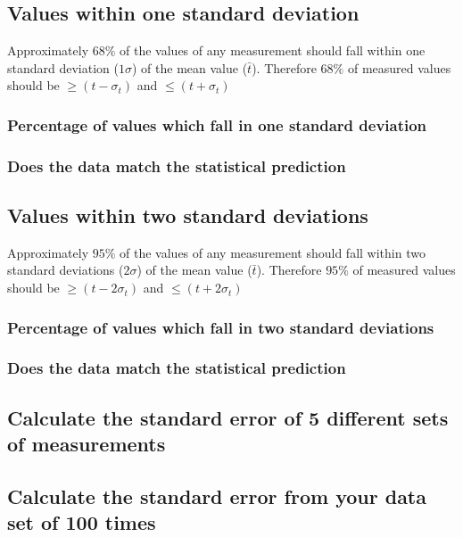 \documentclass[11pt, letterpaper, includehead]{article}
\begin{document}
  \subsection{Values within one standard deviation} %
  Approximately $68\%$ of the values of any measurement should fall within one 
  standard deviation ($1 \sigma$) of the mean value ($\bar{t}$). Therefore $68\%$ of measured 
  values should be $\geq (t - \sigma_t)$ and $\leq (t + \sigma_t)$

  \subsubsection{Percentage of values which fall in one standard deviation}

  \subsubsection{Does the data match the statistical prediction}

  \subsection{Values within two standard deviations} %
  Approximately $95\%$ of the values of any measurement should fall within two 
  standard deviations ($2 \sigma$) of the mean value ($\bar{t}$). Therefore $95\%$ of measured 
  values should be $\geq (t - 2 \sigma_t)$ and $\leq (t + 2 \sigma_t)$

  \subsubsection{Percentage of values which fall in two standard deviations}

  \subsubsection{Does the data match the statistical prediction}

  \subsection{Calculate the standard error of 5 different sets of measurements}

  \subsection{Calculate the standard error from your data set of 100 times}
  
\end{document}
